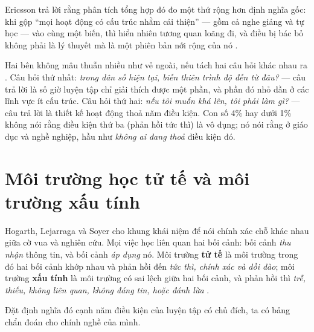 \documentclass[../hieu-suat.tex]{subfiles}
\begin{document}
Ericsson trả lời rằng phân tích tổng hợp đó đo một thứ rộng hơn định nghĩa gốc: khi gộp ``mọi hoạt động có cấu trúc nhằm cải thiện'' --- gồm cả nghe giảng và tự học --- vào cùng một biến, thì hiển nhiên tương quan loãng đi, và điều bị bác bỏ không phải là lý thuyết mà là một phiên bản nới rộng của nó \cite{ericsson2021} \nT{}.

\begin{trucgiac}
Hai bên không mâu thuẫn nhiều như vẻ ngoài, nếu tách hai câu hỏi khác nhau ra \nM{}. Câu hỏi thứ nhất: \emph{trong dân số hiện tại, biến thiên trình độ đến từ đâu?} --- câu trả lời là số giờ luyện tập chỉ giải thích được một phần, và phần đó nhỏ dần ở các lĩnh vực ít cấu trúc. Câu hỏi thứ hai: \emph{nếu tôi muốn khá lên, tôi phải làm gì?} --- câu trả lời là thiết kế hoạt động thoả năm điều kiện. Con số 4\% hay dưới 1\% không nói rằng điều kiện thứ ba (phản hồi tức thì) là vô dụng; nó nói rằng ở giáo dục và nghề nghiệp, hầu như \emph{không ai đang thoả} điều kiện đó.
\end{trucgiac}

\section{Môi trường học tử tế và môi trường xấu tính}

Hogarth, Lejarraga và Soyer \cite{hogarth2015} cho khung khái niệm để nói chính xác chỗ khác nhau giữa cờ vua và nghiên cứu. Mọi việc học liên quan hai bối cảnh: bối cảnh \emph{thu nhận} thông tin, và bối cảnh \emph{áp dụng} nó. Môi trường \textbf{tử tế} là môi trường trong đó hai bối cảnh khớp nhau và phản hồi đến \emph{tức thì, chính xác và dồi dào}; môi trường \textbf{xấu tính} là môi trường có sai lệch giữa hai bối cảnh, và phản hồi thì \emph{trễ, thiếu, không liên quan, không đáng tin, hoặc đánh lừa} \nT{}.

Đặt định nghĩa đó cạnh năm điều kiện của luyện tập có chủ đích, ta có bảng chẩn đoán cho chính nghề của mình.
\end{document}

